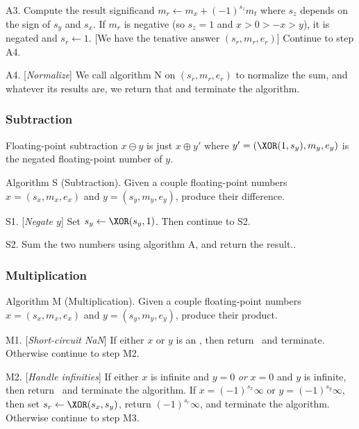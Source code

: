 \algstep A3. Compute the result significand $m_{r}\gets m_{x} + (-1)^{s_{z}}m_{t}$
where $s_{z}$ depends on the sign of $s_{y}$ and $s_{x}$. If $m_{r}$
is negative (so $s_{z}=1$ and $x>0>-x>y$), it is negated and $s_{r}\gets 1$.
[We have the tenative answer $(s_{r}, m_{r}, e_{r})$] Continue to step A4.

\algstep A4. [{\it Normalize\/}] We call algorithm N on $(s_{r}, m_{r}, e_{r})$
to normalize the sum, and whatever its results are, we return that and
terminate the algorithm.\quad\slug


\subsubsection{Subtraction}

\begin{rmk}[Subtraction]
  Floating-point subtraction $x\ominus y$ is just $x\oplus y'$ where
  $y' = (\XOR(1,s_{y}),m_{y},e_{y})$ is the negated floating-point
  number of $y$.
\end{rmk}

\algbegin Algorithm S (Subtraction). \label{alg:float-subtraction}Given a couple floating-point
numbers $x=(s_{x},m_{x},e_{x})$ and $y=(s_{y}, m_{y}, e_{y})$, produce
their difference.

\algstep S1. [{\it Negate $y$\/}] Set $s_{y}\gets\XOR(s_{y},1)$. Then
continue to S2.

\algstep S2. Sum the two numbers using algorithm A, and return the result.\quad\slug.

\subsubsection{Multiplication} 


\algbegin Algorithm M (Multiplication). \label{alg:float-multiplication}Given a couple floating-point
numbers $x=(s_{x},m_{x},e_{x})$ and $y=(s_{y}, m_{y}, e_{y})$, produce
their product.

\algstep M1. [{\it Short-circuit NaN\/}] If either $x$ or $y$ is an
\NaN, then return \qNaN\ and terminate. Otherwise continue to step M2.

\algstep M2. [{\it Handle infinities\/}] If either $x$ is infinite and
$y=0$ \emph{or} $x=0$ and $y$ is infinite, then return \qNaN\ and
terminate the algorithm.
If $x=(-1)^{s_{x}}\infty$ or $y=(-1)^{s_{y}}\infty$, then set
$s_{r}\gets\XOR(s_{x},s_{y})$, return $(-1)^{s_{r}}\infty$, and
terminate the algorithm.
Otherwise continue to step M3.

